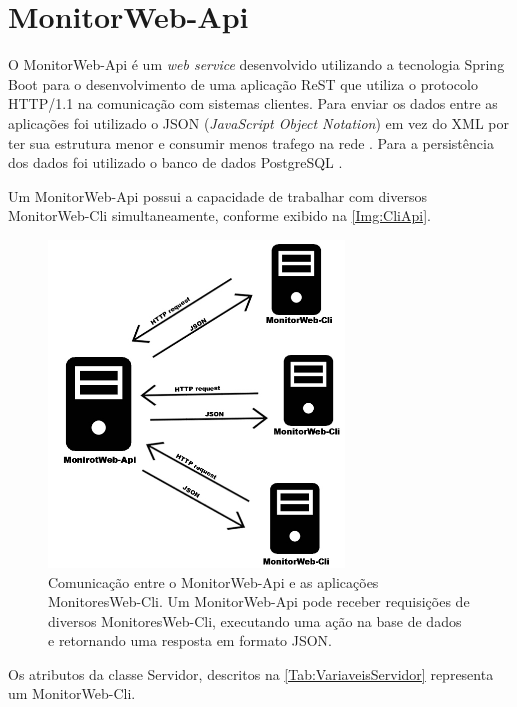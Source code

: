 \section{MonitorWeb-Api}\label{sec:MonitorWeb-Api}

O MonitorWeb-Api é um \textit{web service} desenvolvido utilizando a tecnologia Spring Boot para o desenvolvimento de uma aplicação ReST que utiliza o protocolo HTTP/1.1 na comunicação com sistemas clientes. Para enviar os dados entre as aplicações foi utilizado o JSON (\textit{JavaScript Object Notation}) em vez do XML por ter sua estrutura menor e consumir menos trafego na rede \cite{Saudate:2014}. Para a persistência dos dados foi utilizado o banco de dados PostgreSQL \cite{PostgreSQL:2017}.

Um MonitorWeb-Api possui a capacidade de trabalhar com diversos MonitorWeb-Cli simultaneamente, conforme exibido na \autoref{Img:CliApi}.

\begin{figure}[H]
	\centering
	\includegraphics[width=0.7\textwidth]{figuras/MonitorWeb/MonitorWeb-CliComMonirotWeb-Api.jpg}
	\caption[Comunicação entre o MonitorWeb-Api e as aplicações MonitoresWeb-Cli]{Comunicação entre o MonitorWeb-Api e as aplicações MonitoresWeb-Cli. Um MonitorWeb-Api pode receber requisições de diversos MonitoresWeb-Cli, executando uma ação na base de dados e retornando uma resposta em formato JSON.}
	\label{Img:CliApi}
\end{figure}

Os atributos da classe Servidor, descritos na \autoref{Tab:VariaveisServidor} representa um MonitorWeb-Cli.

